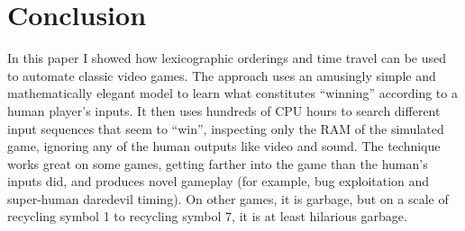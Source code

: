 \documentclass[twocolumn]{article}
\begin{document}
\section{Conclusion}

In this paper I showed how lexicographic orderings and time travel can
be used to automate classic video games. The approach uses an
amusingly simple and mathematically elegant model to learn what
constitutes ``winning'' according to a human player's inputs. It then
uses hundreds of CPU hours to search different input sequences that
seem to ``win'', inspecting only the RAM of the simulated game,
ignoring any of the human outputs like video and sound. The technique
works great on some games, getting farther into the game than the
human's inputs did, and produces novel gameplay (for example, bug
exploitation and super-human daredevil timing). On other games, it is
garbage, but on a scale of recycling symbol 1 to recycling symbol 7,
it is at least hilarious garbage.



\end{document}
